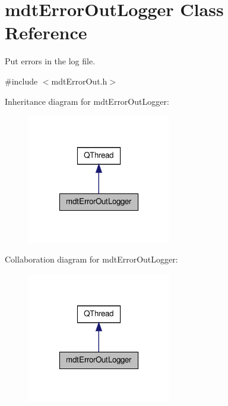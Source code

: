 \hypertarget{classmdt_error_out_logger}{\section{mdt\-Error\-Out\-Logger Class Reference}
\label{classmdt_error_out_logger}
}


Put errors in the log file.  




{\ttfamily \#include $<$mdt\-Error\-Out.\-h$>$}



Inheritance diagram for mdt\-Error\-Out\-Logger\-:\nopagebreak
\begin{figure}[H]
\begin{center}
\leavevmode
\includegraphics[width=178pt]{classmdt_error_out_logger__inherit__graph}
\end{center}
\end{figure}


Collaboration diagram for mdt\-Error\-Out\-Logger\-:\nopagebreak
\begin{figure}[H]
\begin{center}
\leavevmode
\includegraphics[width=178pt]{classmdt_error_out_logger__coll__graph}
\end{center}
\end{figure}
